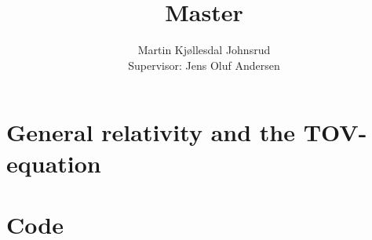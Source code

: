 \documentclass{book}
\title{\huge{Master}}
\author{
    \large{Martin Kjøllesdal Johnsrud }\\
    \normalsize{Supervisor: Jens Oluf Andersen}
    }
\begin{document}
    \maketitle
    \listoftodos
    \tableofcontents


    \chapter{General relativity and the TOV-equation}
    \label{chapter: GR}

    
    
    
    

    \appendix
    
    \chapter{Code}

    

    \printbibliography
\end{document}
